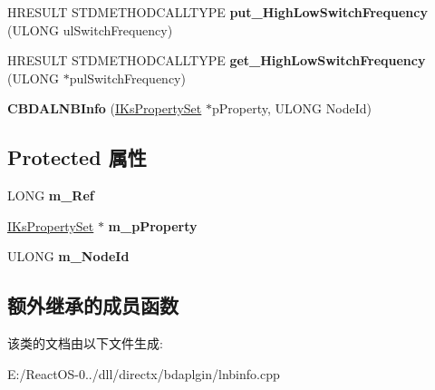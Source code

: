 \begin{DoxyCompactItemize}
\mbox{\label{class_c_b_d_a_l_n_b_info_ad4e942ac40c5cbe76ee9a8a621203ebd}} 
H\+R\+E\+S\+U\+LT S\+T\+D\+M\+E\+T\+H\+O\+D\+C\+A\+L\+L\+T\+Y\+PE {\bfseries put\+\_\+\+High\+Low\+Switch\+Frequency} (U\+L\+O\+NG ul\+Switch\+Frequency)
\item 
\mbox{\label{class_c_b_d_a_l_n_b_info_af6afa46c4b039ceb2baa2042b07b5540}} 
H\+R\+E\+S\+U\+LT S\+T\+D\+M\+E\+T\+H\+O\+D\+C\+A\+L\+L\+T\+Y\+PE {\bfseries get\+\_\+\+High\+Low\+Switch\+Frequency} (U\+L\+O\+NG $\ast$pul\+Switch\+Frequency)
\item 
\mbox{\label{class_c_b_d_a_l_n_b_info_aa345e187669043af1b0494fe7d48ab8a}} 
{\bfseries C\+B\+D\+A\+L\+N\+B\+Info} (\hyperlink{interface_i_ks_property_set}{I\+Ks\+Property\+Set} $\ast$p\+Property, U\+L\+O\+NG Node\+Id)
\end{DoxyCompactItemize}
\subsection*{Protected 属性}
\begin{DoxyCompactItemize}
\item 
\mbox{\label{class_c_b_d_a_l_n_b_info_a6248d97dc95f219bb14a7b9c58a5c11c}} 
L\+O\+NG {\bfseries m\+\_\+\+Ref}
\item 
\mbox{\label{class_c_b_d_a_l_n_b_info_a1c65d658f9a85bff10954bccfc47d647}} 
\hyperlink{interface_i_ks_property_set}{I\+Ks\+Property\+Set} $\ast$ {\bfseries m\+\_\+p\+Property}
\item 
\mbox{\label{class_c_b_d_a_l_n_b_info_ac497d4dfe1d547b3bbb8a50145bcd16b}} 
U\+L\+O\+NG {\bfseries m\+\_\+\+Node\+Id}
\end{DoxyCompactItemize}
\subsection*{额外继承的成员函数}


该类的文档由以下文件生成\+:\begin{DoxyCompactItemize}
\item 
E\+:/\+React\+O\+S-\/0../dll/directx/bdaplgin/lnbinfo.\+cpp\end{DoxyCompactItemize}
